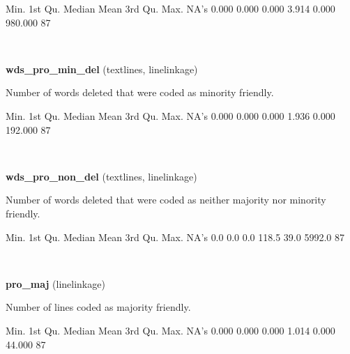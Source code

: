 \documentclass[]{article}
\newenvironment{Shaded}{\begin{snugshade}}{\end{snugshade}}
\newcommand{\StringTok}[1]{\textcolor[rgb]{0.31,0.60,0.02}{{#1}}}
\newcommand{\NormalTok}[1]{{#1}}
\begin{document}
\begin{Shaded}
\begin{Highlighting}[]
   \NormalTok{Min. 1st Qu.  Median    Mean 3rd Qu.    Max.    NA}\StringTok{'s }
\StringTok{  0.000   0.000   0.000   3.914   0.000 980.000      87 }
\end{Highlighting}
\end{Shaded}

~

\vspace{1em}

\textbf{wds\_pro\_min\_del} (textlines, linelinkage)

Number of words deleted that were coded as minority friendly.

\begin{Shaded}
\begin{Highlighting}[]
   \NormalTok{Min. 1st Qu.  Median    Mean 3rd Qu.    Max.    NA}\StringTok{'s }
\StringTok{  0.000   0.000   0.000   1.936   0.000 192.000      87 }
\end{Highlighting}
\end{Shaded}

~

\vspace{1em}

\textbf{wds\_pro\_non\_del} (textlines, linelinkage)

Number of words deleted that were coded as neither majority nor minority
friendly.

\begin{Shaded}
\begin{Highlighting}[]
   \NormalTok{Min. 1st Qu.  Median    Mean 3rd Qu.    Max.    NA}\StringTok{'s }
\StringTok{    0.0     0.0     0.0   118.5    39.0  5992.0      87 }
\end{Highlighting}
\end{Shaded}

~

\vspace{1em}

\textbf{pro\_maj} (linelinkage)

Number of lines coded as majority friendly.

\begin{Shaded}
\begin{Highlighting}[]
   \NormalTok{Min. 1st Qu.  Median    Mean 3rd Qu.    Max.    NA}\StringTok{'s }
\StringTok{  0.000   0.000   0.000   1.014   0.000  44.000      87 }
\end{Highlighting}
\end{Shaded}
\end{document}
